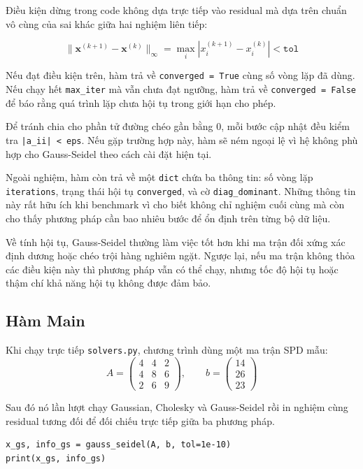 \documentclass[12pt, a4paper, twoside]{article}
\begin{document}
Điều kiện dừng trong code không dựa trực tiếp vào residual mà dựa trên chuẩn vô cùng của sai khác giữa hai nghiệm liên tiếp:

\[
\|\mathbf{x}^{(k+1)} - \mathbf{x}^{(k)}\|_{\infty} = \max_i \left|x_i^{(k+1)} - x_i^{(k)}\right| < \texttt{tol}
\]

Nếu đạt điều kiện trên, hàm trả về \texttt{converged = True} cùng số vòng lặp đã dùng. Nếu chạy hết \texttt{max\_iter} mà vẫn chưa đạt ngưỡng, hàm trả về \texttt{converged = False} để báo rằng quá trình lặp chưa hội tụ trong giới hạn cho phép.

Để tránh chia cho phần tử đường chéo gần bằng 0, mỗi bước cập nhật đều kiểm tra \texttt{|a\_ii| < eps}. Nếu gặp trường hợp này, hàm sẽ ném ngoại lệ vì hệ không phù hợp cho Gauss-Seidel theo cách cài đặt hiện tại.

Ngoài nghiệm, hàm còn trả về một \texttt{dict} chứa ba thông tin: số vòng lặp \texttt{iterations}, trạng thái hội tụ \texttt{converged}, và cờ \texttt{diag\_dominant}. Những thông tin này rất hữu ích khi benchmark vì cho biết không chỉ nghiệm cuối cùng mà còn cho thấy phương pháp cần bao nhiêu bước để ổn định trên từng bộ dữ liệu.

Về tính hội tụ, Gauss-Seidel thường làm việc tốt hơn khi ma trận đối xứng xác định dương hoặc chéo trội hàng nghiêm ngặt. Ngược lại, nếu ma trận không thỏa các điều kiện này thì phương pháp vẫn có thể chạy, nhưng tốc độ hội tụ hoặc thậm chí khả năng hội tụ không được đảm bảo.

\subsection{Hàm Main}

Khi chạy trực tiếp \texttt{solvers.py}, chương trình dùng một ma trận SPD mẫu:
\[
A = \begin{pmatrix}
4 & 4 & 2\\
4 & 8 & 6\\
2 & 6 & 9
\end{pmatrix}, \qquad
b = \begin{pmatrix} 14 \\ 26 \\ 23 \end{pmatrix}
\]

Sau đó nó lần lượt chạy Gaussian, Cholesky và Gauss-Seidel rồi in nghiệm cùng residual tương đối để đối chiếu trực tiếp giữa ba phương pháp.

\begin{lstlisting}
x_gs, info_gs = gauss_seidel(A, b, tol=1e-10)
print(x_gs, info_gs)
\end{lstlisting}
\end{document}
